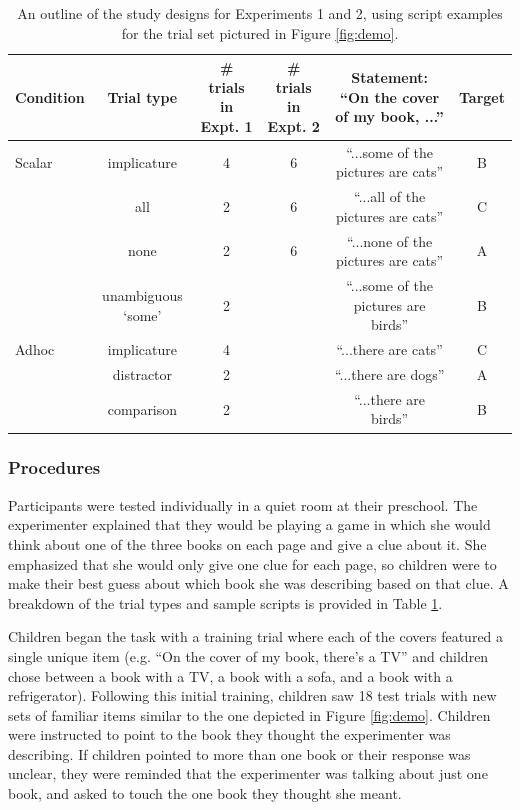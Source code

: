 \documentclass[10pt,letterpaper]{article}
\begin{document}
 \begin{table} [t]
   \caption{An outline of the study designs for Experiments 1 and 2, using script examples for the trial set pictured in Figure \ref{fig:demo}.  \label{tab:scripts} } 
   \begin{center} 
     \begin{tabular}{lccccc} 
                      \hline 
       \null   Condition  & Trial type & \# trials in Expt. 1 & \# trials in Expt. 2 & Statement: ``On the cover of my book, ...'' & Target   \\ 
       \hline  
            Scalar & implicature & 4 & 6 &  ``...some of the pictures are cats'' & B	 \\ 
          & all  & 2 &  6 & ``...all of the pictures are cats'' & C		                 \\
           & none  & 2 & 6 & ``...none of the pictures are cats'' & A			\\ 
               & unambiguous `some' 	&  2 &  & ``...some of the pictures are birds'' & B					        \\ 
	\hline
	    Adhoc       & implicature & 4 &  & ``...there are cats'' & C 		\\ 
	     & distractor & 2 &  & ``...there are dogs'' & A	     \\ 
          & comparison & 2 &  & ``...there are birds'' & B 	   \\
       \hline 
     \end{tabular} 
  \end{center}
 \end{table}
 


\subsubsection{Procedures}

Participants were tested individually in a quiet room at their preschool.  The experimenter explained that they would be playing a game in which she would think about one of the three books on each page and give a clue about it. She emphasized that she would only give one clue for each page, so children were to make their best guess about which book she was describing based on that clue. A breakdown of the trial types and sample scripts is provided in Table \ref{tab:scripts}.

Children began the task with a training trial where each of the covers featured a single unique item (e.g. ``On the cover of my book, there's a TV'' and children chose between a book with a TV, a book with a sofa, and a book with a refrigerator).  Following this initial training, children saw 18 test trials with new sets of familiar items similar to the one depicted in Figure \ref{fig:demo}.  Children were instructed to point to the book they thought the experimenter was describing. If children pointed to more than one book or their response was unclear, they were reminded that the experimenter was talking about just one book, and asked to touch the one book they thought she meant.  
\end{document}
